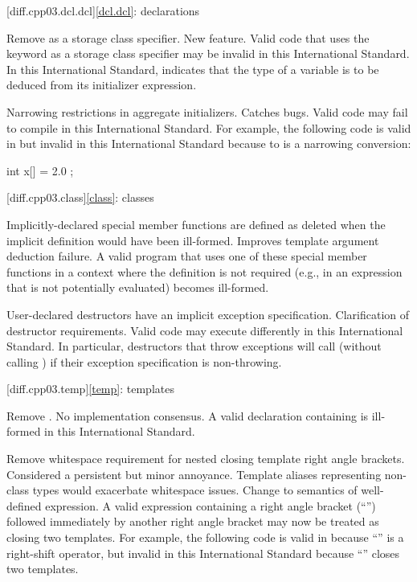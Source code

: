 [diff.cpp03.dcl.dcl]{\ref{dcl.dcl}: declarations}

\change
Remove  as a storage class specifier.
\rationale
New feature.
\effect
Valid \CppIII{} code that uses the keyword  as a storage class
specifier may be invalid in this International Standard. In this International
Standard,  indicates that the type of a variable is to be deduced
from its initializer expression.

\change
Narrowing restrictions in aggregate initializers.
\rationale
Catches bugs.
\effect
Valid \CppIII{} code may fail to compile in this International Standard. For
example, the following code is valid in \CppIII{} but invalid in this
International Standard because  to  is a narrowing
conversion:

\begin{codeblock}
int x[] = { 2.0 };
\end{codeblock}

[diff.cpp03.class]{\ref{class}: classes}

\change
Implicitly-declared special member functions are defined as deleted
when the implicit definition would have been ill-formed.
\rationale
Improves template argument deduction failure.
\effect
A valid \CppIII{} program that uses one of these special member functions in a
context where the definition is not required (e.g., in an expression that is
not potentially evaluated) becomes ill-formed.

\change
User-declared destructors have an implicit exception specification.
\rationale
Clarification of destructor requirements.
\effect
Valid \CppIII{} code may execute differently in this International Standard. In
particular, destructors that throw exceptions will call 
(without calling ) if their exception specification is
non-throwing.

[diff.cpp03.temp]{\ref{temp}: templates}

\change
Remove .
\rationale
No implementation consensus.
\effect
A valid \CppIII{} declaration containing  is ill-formed in this
International Standard.

\change
Remove whitespace requirement for nested closing template right angle
brackets.
\rationale
Considered a persistent but minor annoyance. Template aliases
representing non-class types would exacerbate whitespace issues.
\effect
Change to semantics of well-defined expression. A valid \CppIII{} expression
containing a right angle bracket (``\tcode{>}'') followed immediately by
another right angle bracket may now be treated as closing two templates.
For example, the following code is valid in \CppIII{} because ``\tcode{>>}''
is a right-shift operator, but invalid in this International Standard because
``\tcode{>>}'' closes two templates.

